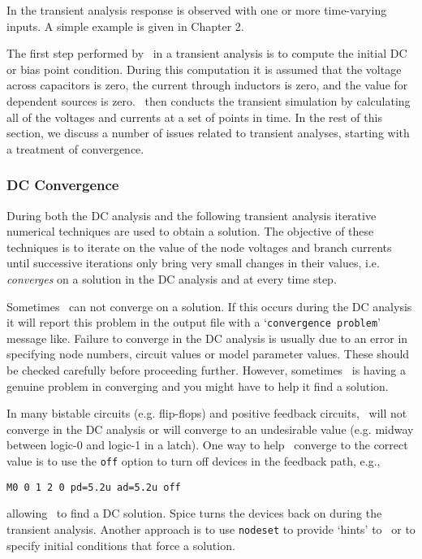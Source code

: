 In the transient analysis response is observed
with one or more time-varying inputs.
A simple example is given in Chapter 2.

The first step performed by \spice\ in a transient analysis is to
compute the initial DC or bias point condition.  During this
computation it is
assumed that the voltage across capacitors is zero, the current
through inductors is zero, and the value for dependent sources is zero.
\spice\ then conducts
the transient simulation by calculating all of the voltages and
currents at a set of points in time.
In the rest of this section, we discuss a number of issues related
to transient analyses, starting with a treatment of convergence.

\subsubsection{DC Convergence}
\label{convergence}

During both the DC analysis and the following transient analysis
iterative numerical techniques are used to obtain a solution.
The objective of these techniques is to iterate on the value
of the node voltages and branch currents until successive iterations
only bring very small changes in their values, i.e. \spice\ {\em
converges} on a solution in the DC analysis and at every time step.

Sometimes \spice\ can not converge on a solution.
If this occurs during the DC analysis it will report this problem in the
output file with a `{\tt convergence problem}' message like.
Failure to converge in the DC analysis is usually due to an error in
specifying node numbers, circuit values or model parameter values.
These should be checked carefully before proceeding further.
However, sometimes \spice\ is having a genuine problem in converging
and you might have to help it find a solution.

In many bistable circuits (e.g. flip-flops) and positive feedback circuits,
\spice\ will not converge in the DC analysis or will converge to
an undesirable value (e.g. midway between logic-0 and logic-1 in a
latch).  One way to help \spice\ converge to the correct value is to
use the {\tt off} option to turn off devices in the feedback path, e.g.,
\begin{center}
{\tt M0 0 1 2 0 pd=5.2u ad=5.2u off}
\end{center}
allowing \spice\ to find a DC solution.  Spice turns the devices back on
during the transient analysis.
Another approach is to use {\tt nodeset} to provide `hints' to \spice\
or to specify initial conditions that force a solution.

